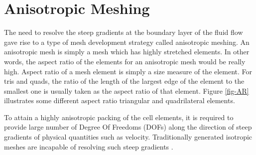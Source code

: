 \section{Anisotropic Meshing}

The need to resolve the steep gradients at the boundary layer of the fluid flow gave rise to a type of mesh development strategy called anisotropic meshing. An anisotropic mesh is simply a mesh which has highly stretched elements. In other words, the aspect ratio of the elements for an anisotropic mesh would be really high. Aspect ratio of a mesh element is simply a size measure of the element. For tris and quads, the ratio of the length of the largest edge of the element to the smallest one is usually taken as the aspect ratio of that element. Figure \ref{fig-AR} illustrates some different aspect ratio triangular and quadrilateral elements. 

To attain a highly anisotropic packing of the cell elements, it is required to provide large number of Degree Of Freedoms (DOFs) along the direction of steep gradients of physical quantities such as velocity. Traditionally generated isotropic meshes are incapable of resolving such steep gradients \cite{frey2005anisotropic}. 

